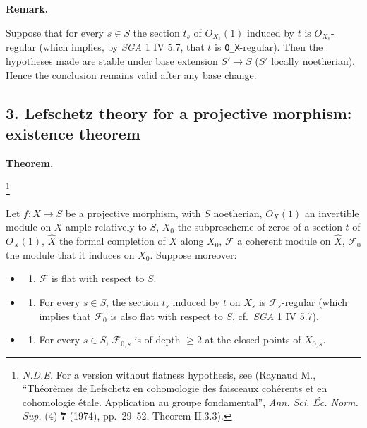 \documentclass[
]{article}
\providecommand{\tightlist}{%
  \setlength{\itemsep}{0pt}\setlength{\parskip}{0pt}}
\begin{document}
\textbf{Remark.}

Suppose that for every \(s \in S\) the section \(t_{s}\) of
\(O_{X_{s}}(1)\) induced by \(t\) is \(O_{X_{s}}\)-regular (which
implies, by \emph{SGA} 1 IV 5.7, that \(t\) is \texttt{O\_X}-regular).
Then the hypotheses made are stable under base extension \(S' \to S\)
(\(S'\) locally noetherian). Hence the conclusion remains valid after
any base change.

\subsection{3. Lefschetz theory for a projective morphism: existence
theorem}\label{lefschetz-theory-for-a-projective-morphism-existence-theorem}

\textbf{Theorem.}

\footnote{\emph{N.D.E.} For a version without flatness hypothesis, see
  (Raynaud M., ``Théorèmes de Lefschetz en cohomologie des faisceaux
  cohérents et en cohomologie étale. Application au groupe
  fondamental'', \emph{Ann. Sci. Éc. Norm. Sup.} (4) \textbf{7} (1974),
  pp.~29--52, Theorem II.3.3).}

Let \(f: X \to S\) be a projective morphism, with \(S\) noetherian,
\(O_{X}(1)\) an invertible module on \(X\) ample relatively to \(S\),
\(X_{0}\) the subprescheme of zeros of a section \(t\) of \(O_{X}(1)\),
\(\hat{X}\) the formal completion of \(X\) along \(X_{0}\),
\(\mathcal{F}\) a coherent module on \(\hat{X}\), \(\mathcal{F}_{0}\)
the module that it induces on \(X_{0}\). Suppose moreover:

\begin{itemize}
\tightlist
\item
  \begin{enumerate}
  \def\labelenumi{\alph{enumi})}
  \tightlist
  \item
    \(\mathcal{F}\) is flat with respect to \(S\).
  \end{enumerate}
\item
  \begin{enumerate}
  \def\labelenumi{\alph{enumi})}
  \setcounter{enumi}{1}
  \tightlist
  \item
    For every \(s \in S\), the section \(t_{s}\) induced by \(t\) on
    \(X_{s}\) is \(\mathcal{F}_{s}\)-regular (which implies that
    \(\mathcal{F}_{0}\) is also flat with respect to \(S\),
    cf.~\emph{SGA} 1 IV 5.7).
  \end{enumerate}
\item
  \begin{enumerate}
  \def\labelenumi{\alph{enumi})}
  \setcounter{enumi}{2}
  \tightlist
  \item
    For every \(s \in S\), \(\mathcal{F}_{0,s}\) is of depth
    \(\geqslant 2\) at the closed points of \(X_{0,s}\).
  \end{enumerate}
\end{itemize}
\end{document}
